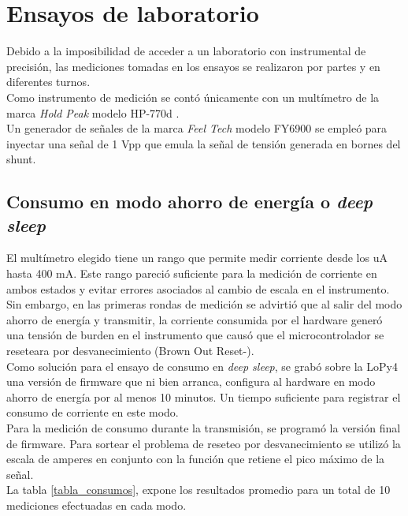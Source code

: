 \section{Ensayos de laboratorio}
Debido a la imposibilidad de acceder a un laboratorio con instrumental de precisión, las mediciones tomadas en los ensayos se realizaron por partes y en diferentes turnos.\\
Como instrumento de medición se contó únicamente con un multímetro de la marca \textit{Hold Peak} modelo HP-770d \citep{hp770d}.\\
Un generador de señales de la marca \textit{Feel Tech} modelo FY6900 se empleó para inyectar una señal de 1 Vpp que emula la señal de tensión generada en bornes del shunt.
\subsection{Consumo en modo ahorro de energía o \textit{deep sleep}}
El mult\'{i}metro elegido tiene un rango que permite medir corriente desde los uA hasta 400 mA. Este rango pareció suficiente para la medición de corriente en ambos estados y evitar errores asociados al cambio de escala en el instrumento. Sin embargo, en las primeras rondas de medición se advirtió que al salir del modo ahorro de energía y transmitir, la corriente consumida por el hardware generó una tensión de burden en el instrumento que causó que el microcontrolador se reseteara por desvanecimiento (Brown Out Reset-).\\
Como solución para el ensayo de consumo en \textit{deep sleep}, se grabó sobre la LoPy4 una versión de firmware que ni bien arranca, configura al hardware en modo ahorro de energía por al menos 10 minutos. Un tiempo suficiente para registrar el consumo de corriente en este modo.\\
Para la medición de consumo durante la transmisión, se programó la versión final de firmware. Para sortear el problema de reseteo por desvanecimiento se utilizó la escala de amperes en conjunto con la función que retiene el pico máximo de la señal.\\
La tabla \ref{tabla_consumos}, expone los resultados promedio para un total de 10 mediciones efectuadas en cada modo.\\

